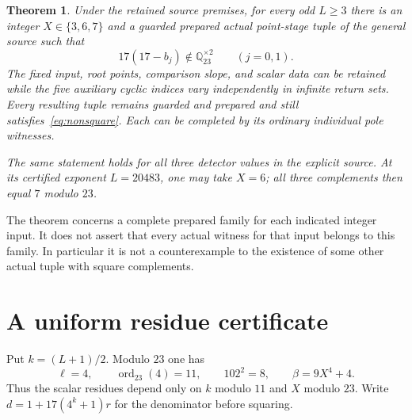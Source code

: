 \documentclass[11pt,a4paper]{article}
\newtheorem{theorem}{Theorem}[section]
\newcommand{\Q}{\mathbb Q}\newcommand{\Z}{\mathbb Z}
\begin{document}
\begin{theorem}\label{thm:actual}
Under the retained source premises, for every odd $L\ge3$ there is an
integer $X\in\{3,6,7\}$ and a guarded prepared actual point-stage tuple
of the general source such that
\begin{equation}\label{eq:nonsquare}
                  17(17-b_j)\notin\Q_{23}^{\times2}
                  \qquad(j=0,1).
\end{equation}
The fixed input, root points, comparison slope, and scalar data can be
retained while the five auxiliary cyclic indices vary independently in
infinite return sets. Every resulting tuple remains guarded and prepared
and still satisfies~\eqref{eq:nonsquare}. Each can be completed by its
ordinary individual pole witnesses.

The same statement holds for all three detector values in the explicit
source. At its certified exponent $L=20483$, one may take $X=6$; all
three complements then equal $7$ modulo $23$.
\end{theorem}

The theorem concerns a complete prepared family for each indicated
integer input. It does not assert that every actual witness for that
input belongs to this family. In particular it is not a counterexample
to the existence of some other actual tuple with square complements.

\section{A uniform residue certificate}

Put $k=(L+1)/2$. Modulo $23$ one has
\[
 \ell=4,\qquad \operatorname{ord}_{23}(4)=11,\qquad
 102^2=8,\qquad \beta=9X^4+4.
\]
Thus the scalar residues depend only on $k$ modulo $11$ and $X$ modulo
$23$. Write $d=1+17(4^k+1)r$ for the denominator before squaring.
\end{document}
